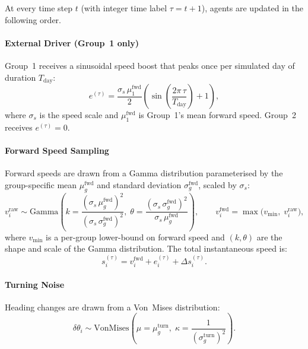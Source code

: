\documentclass{article}
\begin{document}
{At every time step $t$ (with integer time label $\tau = t + 1$), agents are
updated in the following order.

\paragraph{External Driver (Group~1 only)}

Group~1 receives a sinusoidal speed boost that peaks once per simulated day
of duration $T_{\mathrm{day}}$:
%
\begin{equation}
  e^{(\tau)} = \frac{\sigma_s \, \mu_1^{\mathrm{fwd}}}{2}
               \left(\sin\!\left(\frac{2\pi\,\tau}{T_{\mathrm{day}}}\right) + 1\right),
\end{equation}
%
where $\sigma_s$ is the speed scale and
$\mu_1^{\mathrm{fwd}}$ is Group~1's mean forward speed.  Group~2 receives
$e^{(\tau)} = 0$.

\paragraph{Forward Speed Sampling}

Forward speeds are drawn from a Gamma distribution parameterised by the
group-specific mean $\mu_g^{\mathrm{fwd}}$ and standard deviation
$\sigma_g^{\mathrm{fwd}}$, scaled by $\sigma_s$:
%
\begin{equation}\label{eq:gamma_si}
  v_i^{\mathrm{raw}} \sim \mathrm{Gamma}\!\left(
    k = \frac{(\sigma_s\,\mu_g^{\mathrm{fwd}})^2}{(\sigma_s\,\sigma_g^{\mathrm{fwd}})^2},\;
    \theta = \frac{(\sigma_s\,\sigma_g^{\mathrm{fwd}})^2}{\sigma_s\,\mu_g^{\mathrm{fwd}}}
  \right),
  \qquad
  v_i^{\mathrm{fwd}} = \max\!\bigl(v_{\min},\; v_i^{\mathrm{raw}}\bigr),
\end{equation}
%
where $v_{\min}$ is a per-group lower-bound on forward speed and
$(k, \theta)$ are the shape and scale of the Gamma distribution.  The total
instantaneous speed is:
%
\begin{equation}
  s_i^{(\tau)} = v_i^{\mathrm{fwd}} + e_i^{(\tau)} + \Delta s_i^{(\tau)}.
\end{equation}

\paragraph{Turning Noise}

Heading changes are drawn from a Von~Mises distribution:
%
\begin{equation}\label{eq:vonmises_si}
  \delta\theta_i \sim \mathrm{VonMises}\!\left(
    \mu = \mu_g^{\mathrm{turn}},\;
    \kappa = \frac{1}{(\sigma_g^{\mathrm{turn}})^2}
  \right).
\end{equation}

}
\end{document}
